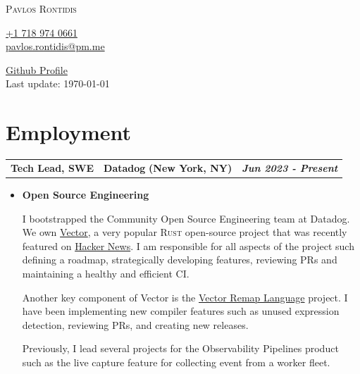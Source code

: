 \documentclass[a4paper,10pt]{article}
\newcommand*{\mahogany}{\textcolor{Mahogany}}
\newcommand{\jobtitle}[4]{
\vspace{0.3cm}
\begin{tabularx}
{\textwidth}
{ >{\raggedright\arraybackslash}p{6.5cm}
  >{\raggedright\arraybackslash}X
  >{\raggedleft\arraybackslash}p{4cm} }
\large\textbf{#1} &
\large\textbf{\mahogany{#2}} \normalsize\textbf{(#3)} &
\textit{\large\textbf{#4}}
\end{tabularx}
\vspace{-0.4cm}
}
\begin{document}
\pagestyle{empty} %

\begin{minipage}{.40\linewidth}
\begin{flushleft}
\Huge \textsc{Pavlos Rontidis}
\end{flushleft}
\end{minipage}
\hfill
\begin{minipage}{.25\linewidth}
\begin{flushright}
\href{tel:15555555555}{+1 718 974 0661} \\
\href{mailto:pavlos.rontidis@pm.me}{pavlos.rontidis@pm.me}\\
\end{flushright}
\end{minipage}
\hfill
\begin{minipage}{.30\linewidth}
\begin{flushright}
\href{https://github.com/pront}{Github Profile} \\
Last update: \today
\end{flushright}
\end{minipage}

\noindent\makebox[\linewidth]{\rule{\linewidth}{0.4pt}}

\section{Employment}
\jobtitle{Tech Lead, SWE}{Datadog}{New York, NY}{Jun 2023 - Present}
\begin{itemize}[leftmargin=.27in,label=] \setlength\itemsep{-0.1cm}
	\item \textbf{Open Source Engineering}

I bootstrapped the Community Open Source Engineering team at Datadog.  We own \href{https://github.com/vectordotdev/vector}{Vector},
a very popular \textsc{Rust} open-source project that was recently featured on
\href{https://news.ycombinator.com/item?id=39737122}{Hacker News}. I am responsible for all aspects of the project such defining a roadmap, strategically developing features, reviewing PRs and maintaining a healthy and efficient CI.

Another key component of Vector is the \href{https://github.com/vectordotdev/vrl}{Vector Remap Language} project. I have been implementing new compiler features such as unused expression detection, reviewing PRs, and creating new releases.

Previously, I lead several projects for the Observability Pipelines product such as the live capture feature for collecting event from a worker fleet.

\end{itemize}
\end{document}

